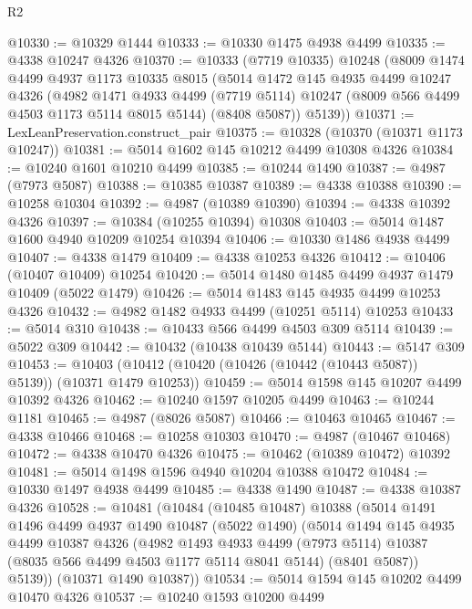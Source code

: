 \begin{lexlean}{R2}
\begin{coremodule}
@10330 := @10329 @1444
@10333 := @10330 @1475 @4938 @4499
@10335 := @4338 @10247 @4326
@10370 := @10333
    (@7719 @10335)
    @10248
    (@8009
      @1474
      @4499
      @4937
      @1173
      @10335
      @8015
      (@5014
        @1472
        @145
        @4935
        @4499
        @10247
        @4326
        (@4982
          @1471
          @4933
          @4499
          (@7719 @5114)
          @10247
          (@8009 @566 @4499 @4503 @1173 @5114 @8015 @5144)
          (@8408 @5087))
        @5139))
@10371 := LexLeanPreservation.construct_pair
@10375 := @10328 (@10370 (@10371 @1173 @10247))
@10381 := @5014 @1602 @145 @10212 @4499 @10308 @4326
@10384 := @10240 @1601 @10210 @4499
@10385 := @10244 @1490
@10387 := @4987 (@7973 @5087)
@10388 := @10385 @10387
@10389 := @4338 @10388
@10390 := @10258 @10304
@10392 := @4987 (@10389 @10390)
@10394 := @4338 @10392 @4326
@10397 := @10384 (@10255 @10394) @10308
@10403 := @5014 @1487 @1600 @4940 @10209 @10254 @10394
@10406 := @10330 @1486 @4938 @4499
@10407 := @4338 @1479
@10409 := @4338 @10253 @4326
@10412 := @10406 (@10407 @10409) @10254
@10420 := @5014 @1480 @1485 @4499 @4937 @1479 @10409 (@5022 @1479)
@10426 := @5014 @1483 @145 @4935 @4499 @10253 @4326
@10432 := @4982 @1482 @4933 @4499 (@10251 @5114) @10253
@10433 := @5014 @310
@10438 := @10433 @566 @4499 @4503 @309 @5114
@10439 := @5022 @309
@10442 := @10432 (@10438 @10439 @5144)
@10443 := @5147 @309
@10453 := @10403 (@10412 (@10420 (@10426 (@10442 (@10443 @5087)) @5139)) (@10371 @1479 @10253))
@10459 := @5014 @1598 @145 @10207 @4499 @10392 @4326
@10462 := @10240 @1597 @10205 @4499
@10463 := @10244 @1181
@10465 := @4987 (@8026 @5087)
@10466 := @10463 @10465
@10467 := @4338 @10466
@10468 := @10258 @10303
@10470 := @4987 (@10467 @10468)
@10472 := @4338 @10470 @4326
@10475 := @10462 (@10389 @10472) @10392
@10481 := @5014 @1498 @1596 @4940 @10204 @10388 @10472
@10484 := @10330 @1497 @4938 @4499
@10485 := @4338 @1490
@10487 := @4338 @10387 @4326
@10528 := @10481
    (@10484
      (@10485 @10487)
      @10388
      (@5014
        @1491
        @1496
        @4499
        @4937
        @1490
        @10487
        (@5022 @1490)
        (@5014
          @1494
          @145
          @4935
          @4499
          @10387
          @4326
          (@4982
            @1493
            @4933
            @4499
            (@7973 @5114)
            @10387
            (@8035 @566 @4499 @4503 @1177 @5114 @8041 @5144)
            (@8401 @5087))
          @5139))
      (@10371 @1490 @10387))
@10534 := @5014 @1594 @145 @10202 @4499 @10470 @4326
@10537 := @10240 @1593 @10200 @4499

\end{coremodule}
\end{lexlean}
